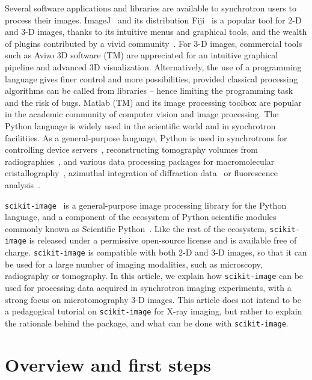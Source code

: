 \documentclass[twocolumn]{bmcart}%
\begin{document}
Several software applications and libraries are available to synchrotron
users to process their images. ImageJ~\citep{Abramoff2004, Schneider2012}
and its distribution Fiji~\citep{Schindelin2012} is a popular tool for
2-D and 3-D images, thanks to its intuitive menus and graphical tools,
and the wealth of plugins contributed by a vivid
community~\citep{Schindelin2015}. For 3-D images, commercial tools such
as Avizo 3D software (TM) are appreciated for an intuitive graphical
pipeline and advanced 3D visualization. Alternatively, the use of a
programming language gives finer control and more possibilities, provided
classical processing algorithms can be called from libraries -- hence
limiting the programming task and the risk of bugs. Matlab (TM) and its
image processing toolbox are popular in the academic community of
computer vision and image processing. The Python language is widely used
in the scientific world and in synchrotron facilitiies. As a
general-purpose language, Python is used in synchrotrons for controlling
device servers~\citep{pytango}, reconstructing tomography volumes from
radiographies~\citep{Gursoy2014, Mirone2014}, and various data
processing packages for macromolecular cristallography~\citep{Adams2010},
azimuthal integration of diffraction data~\citep{Ashiotis2015} or
fluorescence analysis~\citep{pymca}.

\texttt{scikit-image}~\citep{Vanderwalt2014} is a general-purpose image
processing library for the Python language, and a component of the ecosystem of
Python scientific modules commonly known as Scientific
Python~\citep{Oliphant2007}. Like the rest of the ecosystem,
\texttt{scikit-image} is released under a permissive open-source license and is
available free of charge. \texttt{scikit-image} is compatible with both 2-D and
3-D images, so that it can be used for a large number of imaging modalities,
such as microscopy, radiography or tomography. In this article, we explain how
\texttt{scikit-image} can be used for processing data acquired in synchrotron
imaging experiments, with a strong focus on microtomography 3-D images. This
article does not intend to be a pedagogical tutorial on \texttt{scikit-image}
for X-ray imaging, but rather to explain the rationale behind the package, and
what can be done with \texttt{scikit-image}. 


\section*{Overview and first steps}
\end{document}

